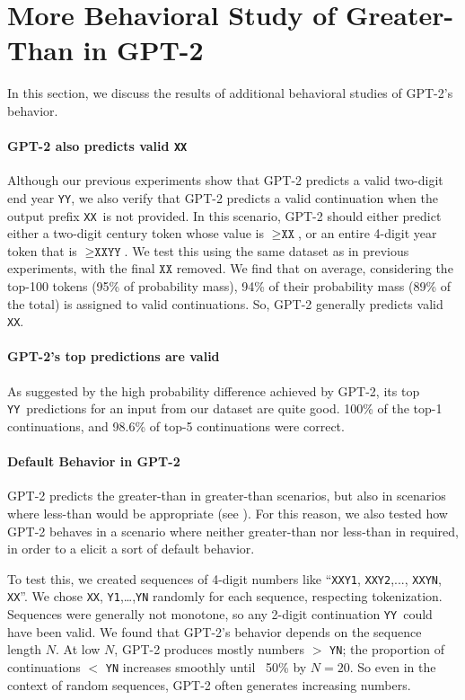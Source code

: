 \documentclass{article}
\newcommand{\XX}{\texttt{XX}}
\newcommand{\YY}{\texttt{YY}}
\begin{document}
    
    
	
    \newpage
    \appendix    
    \section{More Behavioral Study of Greater-Than in GPT-2}\label{app:behavioral}
    In this section, we discuss the results of additional behavioral studies of GPT-2's behavior.

    \paragraph{GPT-2 also predicts valid \XX} Although our previous experiments show that GPT-2 predicts a valid two-digit end year \YY, we also verify that GPT-2 predicts a valid continuation when the output prefix \XX\ is not provided. In this scenario, GPT-2 should either predict either a two-digit century token whose value is $\geq\XX$, or an entire 4-digit year token that is $\geq\XX\YY$. We test this using the same dataset as in previous experiments, with the final $\XX$ removed. We find that on average, considering the top-100 tokens (95\% of probability mass), 94\% of their probability mass (89\% of the total) is assigned to valid continuations. So, GPT-2 generally predicts valid \XX.

    \paragraph{GPT-2's top predictions are valid} As suggested by the high probability difference achieved by GPT-2, its top \YY\ predictions for an input from our dataset are quite good. 100\% of the top-1 continuations, and 98.6\% of top-5 continuations were correct.

    \paragraph{Default Behavior in GPT-2} GPT-2 predicts the greater-than in greater-than scenarios, but also in scenarios where less-than would be appropriate (see ). For this reason, we also tested how GPT-2 behaves in a scenario where neither greater-than nor less-than in required, in order to a elicit a sort of default behavior. 
    
    To test this, we created sequences of 4-digit numbers like ``\XX\texttt{Y1}, \XX\texttt{Y2},..., \XX\texttt{YN}, \XX''. We chose \XX, \texttt{Y1},\ldots,\texttt{YN} randomly for each sequence, respecting tokenization. Sequences were generally not monotone, so any 2-digit continuation \YY\ could have been valid. We found that GPT-2’s behavior depends on the sequence length $N$. At low $N$, GPT-2 produces mostly numbers $>$ \texttt{YN}; the proportion of continuations $<$ \texttt{YN} increases smoothly until ~50\% by $N=20$. So even in the context of random sequences, GPT-2 often generates increasing numbers. 
    
\end{document}

